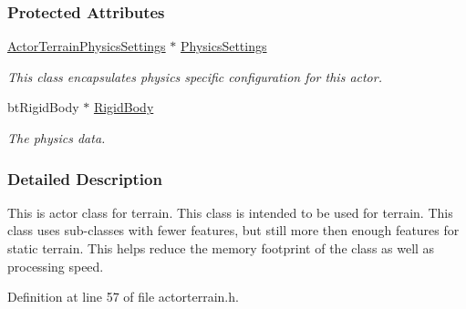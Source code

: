 \subsubsection*{Protected Attributes}
\begin{DoxyCompactItemize}
\item 
\hypertarget{classphys_1_1ActorTerrain_a53c93c2330cb9950667232fbbfb88803}{
\hyperlink{classphys_1_1ActorTerrainPhysicsSettings}{ActorTerrainPhysicsSettings} $\ast$ \hyperlink{classphys_1_1ActorTerrain_a53c93c2330cb9950667232fbbfb88803}{PhysicsSettings}}
\label{classphys_1_1ActorTerrain_a53c93c2330cb9950667232fbbfb88803}

\begin{DoxyCompactList}\small\item\em This class encapsulates physics specific configuration for this actor. \item\end{DoxyCompactList}\item 
\hypertarget{classphys_1_1ActorTerrain_a86b22aad61a7ffceb5c757ddcbca48c3}{
btRigidBody $\ast$ \hyperlink{classphys_1_1ActorTerrain_a86b22aad61a7ffceb5c757ddcbca48c3}{RigidBody}}
\label{classphys_1_1ActorTerrain_a86b22aad61a7ffceb5c757ddcbca48c3}

\begin{DoxyCompactList}\small\item\em The physics data. \item\end{DoxyCompactList}\end{DoxyCompactItemize}


\subsubsection{Detailed Description}
This is actor class for terrain. This class is intended to be used for terrain. This class uses sub-\/classes with fewer features, but still more then enough features for static terrain. This helps reduce the memory footprint of the class as well as processing speed. 

Definition at line 57 of file actorterrain.h.



